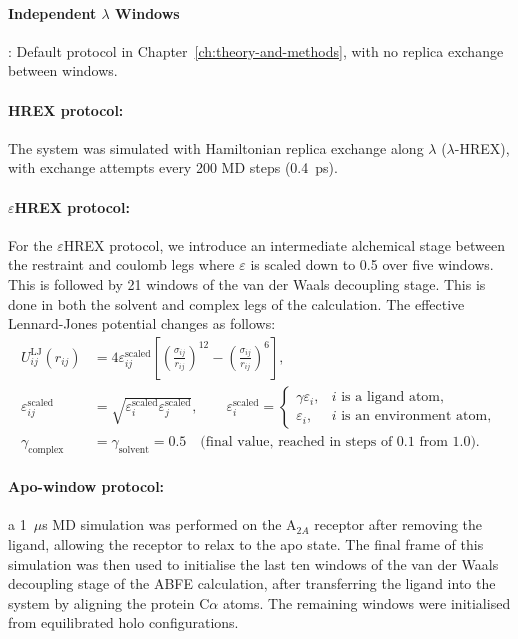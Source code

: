 \paragraph{Independent $ \lambda $ Windows}: Default protocol in Chapter~\ref{ch:theory-and-methods}, with no replica exchange between windows.
\paragraph{HREX protocol:} The system was simulated with Hamiltonian replica exchange along $\lambda$ ($\lambda$-HREX), with exchange attempts every 200 MD steps (0.4~ps).
\paragraph{$\varepsilon$HREX protocol:} For the $\varepsilon$HREX protocol, we introduce an intermediate alchemical stage between the restraint and coulomb legs where $\varepsilon$ is scaled down to 0.5 over five windows. This is followed by 21 windows of the van der Waals decoupling stage. This is done in both the solvent and complex legs of the calculation. The effective Lennard-Jones potential changes as follows:
\begin{equation}
\begin{aligned}
    U_{ij}^{\mathrm{LJ}}(r_{ij})
    &= 4\varepsilon_{ij}^{\mathrm{scaled}}
    \left[
        \left(\frac{\sigma_{ij}}{r_{ij}}\right)^{12}
        -
        \left(\frac{\sigma_{ij}}{r_{ij}}\right)^{6}
    \right], \\
    \varepsilon_{ij}^{\mathrm{scaled}}
    &= \sqrt{\varepsilon_i^{\mathrm{scaled}}
             \varepsilon_j^{\mathrm{scaled}}},
    \qquad
    \varepsilon_i^{\mathrm{scaled}}
    =
    \begin{cases}
        \gamma\varepsilon_i, & i \text{ is a ligand atom}, \\
        \varepsilon_i, & i \text{ is an environment atom},
    \end{cases} \\
    \gamma_{\mathrm{complex}} &= \gamma_{\mathrm{solvent}} = 0.5
    \quad \text{(final value, reached in steps of 0.1 from 1.0)}.
\end{aligned}
\label{eq:scaled-lennard-jones}
\end{equation}
\paragraph{Apo-window protocol:} a 1~$\mu$s MD simulation was performed on the A$_{2A}$ receptor after removing the ligand, allowing the receptor to relax to the apo state. The final frame of this simulation was then used to initialise the last ten windows of the van der Waals decoupling stage of the ABFE calculation, after transferring the ligand into the system by aligning the protein C$\alpha$ atoms. The remaining windows were initialised from equilibrated holo configurations.



